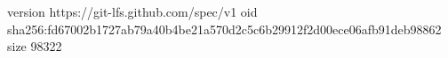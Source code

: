 version https://git-lfs.github.com/spec/v1
oid sha256:fd67002b1727ab79a40b4be21a570d2c5c6b29912f2d00ece06afb91deb98862
size 98322
